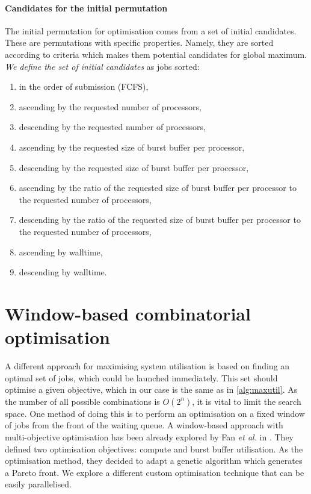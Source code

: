 \documentclass[thesis-en.tex]{subfiles}
\begin{document}
\paragraph{Candidates for the initial permutation}
The initial permutation for optimisation comes from a set of initial candidates. These are permutations with specific properties. Namely, they are sorted according to criteria which makes them potential candidates for global maximum. \emph{We define the set of initial candidates} as jobs sorted:
\begin{enumerate}
    \item in the order of submission (FCFS),
    \item ascending by the requested number of processors,
    \item descending by the requested number of processors,
    \item ascending by the requested size of burst buffer per processor,
    \item descending by the requested size of burst buffer per processor,
    \item ascending by the ratio of the requested size of burst buffer per processor to the requested number of processors,
    \item descending by the ratio of the requested size of burst buffer per processor to the requested number of processors,
    \item ascending by walltime,
    \item descending by walltime.
\end{enumerate}

\section{Window-based combinatorial optimisation} \label{sec:window}
A different approach for maximising system utilisation is based on finding an optimal set of jobs, which could be launched immediately. This set should optimise a given objective, which in our case is the same as in \autoref{alg:maxutil}. As the number of all possible combinations is $O(2^n)$, it is vital to limit the search space. One method of doing this is to perform an optimisation on a fixed window of jobs from the front of the waiting queue. A window-based approach with multi-objective optimisation has been already explored by Fan \textit{et al.} in \cite{10.1145/3307681.3325401}. They defined two optimisation objectives: compute and burst buffer utilisation. As the optimisation method, they decided to adapt a genetic algorithm which generates a Pareto front. We explore a different custom optimisation technique that can be easily parallelised.
\end{document}
